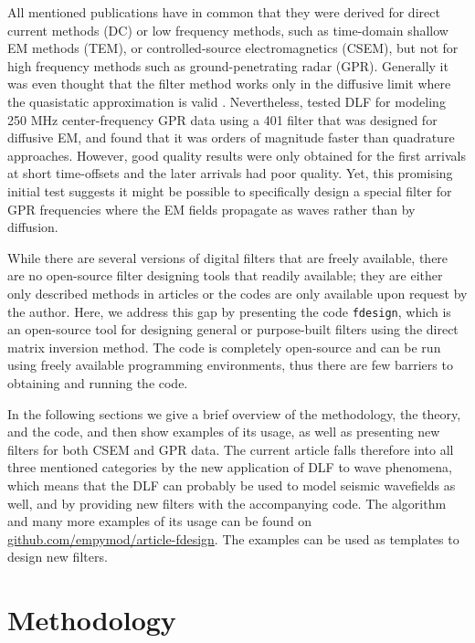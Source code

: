 \documentclass[paper,twocolumn,twoside]{geophysics}
\begin{document}
All mentioned publications have in common that they were derived for direct
current methods (DC) or low frequency methods, such as time-domain shallow EM
methods (TEM), or controlled-source electromagnetics (CSEM), but not for high
frequency methods such as ground-pe\-ne\-tra\-ting radar (GPR). Generally it
was even thought that the filter method works only in the diffusive limit where
the quasistatic approximation is valid \citep[e.g.,][]{GEO.15.Hunziker}.
Nevertheless, \cite{GEO.17.Werthmuller} tested DLF for modeling 250 MHz
center-frequency GPR data using a 401  filter that was
designed for diffusive EM, and found that it was orders of magnitude faster
than quadrature approaches. However, good quality results were only obtained
for the first arrivals at short time-offsets and the later arrivals had poor
quality. Yet, this promising initial test suggests it might be possible to
specifically design a special filter for GPR frequencies where the EM fields
propagate as waves rather than by diffusion.

While there are several versions of digital filters that are freely available,
there are no open-source filter designing tools that readily available; they
are either only described methods in articles or the codes are only available
upon request by the author. Here, we address this gap by presenting the code
\texttt{fdesign}, which is an open-source tool for designing general or
purpose-built filters using the direct matrix inversion method. The code is
completely open-source and can be run using freely available programming
environments, thus there are few barriers to obtaining and running the code.

In the following sections we give a brief overview of the methodology, the
theory, and the code, and then show examples of its usage, as well as
presenting new filters for both CSEM and GPR data. The current article falls
therefore into all three mentioned categories by the new application of DLF to
wave phenomena, which means that the DLF can probably be used to model
seismic wavefields as well, and by providing new filters with the accompanying
code. The algorithm and many more examples of its usage can be found on
\href{https://github.com/empymod/article-fdesign}{github.com/empymod/article-fdesign}.
The examples can be used as templates to design new filters.


\section{Methodology}
\end{document}
